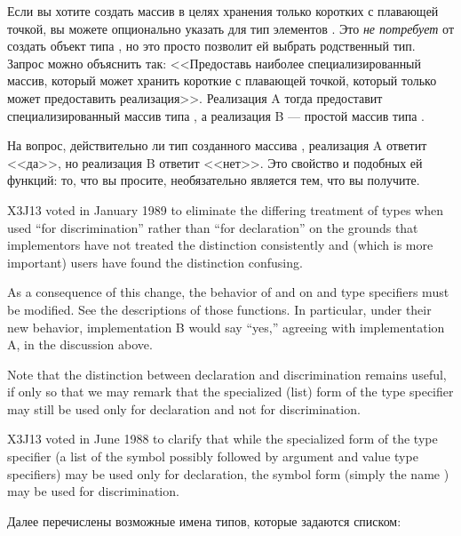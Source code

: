 Если вы хотите создать массив в целях хранения только коротких с плавающей
точкой, вы можете опционально указать для  тип элементов
. Это \emph{не потребует} от  создать объект типа
, но это просто позволит ей выбрать родственный тип. Запрос
можно объяснить так: <<Предоставь наиболее специализированный массив, который
может хранить короткие с плавающей точкой, который только может предоставить
реализация>>. Реализация A тогда предоставит специализированный массив типа
, а реализация B --- простой массив типа .

На вопрос, действительно ли тип созданного массива ,
реализация A ответит <<да>>, но реализация B ответит <<нет>>. Это свойство
 и подобных ей функций: то, что вы просите, необязательно
является тем, что вы получите.

\begin{new}
X3J13 voted in January 1989
to eliminate the differing treatment of types
when used ``for discrimination'' rather than ``for declaration'' on the grounds
that implementors have not treated the distinction consistently
and (which is more important) users have found the distinction confusing.

As a consequence of this change, the behavior of  and 
on  and  type specifiers must be modified.
See the descriptions of those functions.  In particular, under their new
behavior, implementation B would say ``yes,'' agreeing with implementation A,
in the discussion above.

Note that the distinction between declaration and discrimination remains
useful, if only so that we may remark that the specialized (list)
form of the
 type specifier may still be used only for declaration and
not for discrimination.
\end{new}

\begin{new}
X3J13 voted in June 1988  to clarify that
while the specialized form of the  type specifier
(a list of the symbol  possibly followed by
argument and value type specifiers)
may be used only for declaration, the symbol form (simply the name
) may be used for discrimination.
\end{new}

Далее перечислены возможные имена типов, которые задаются списком:

